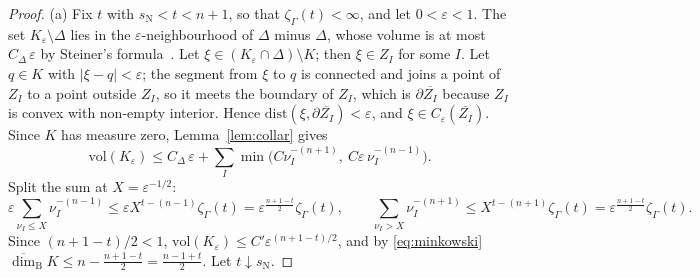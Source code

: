 \documentclass[11pt]{amsart}
\theoremstyle{definition}
\theoremstyle{remark}
\newcommand{\udimB}{\overline{\dim}_{\mathrm B}}
\newcommand{\sN}{s_{\mathrm N}}
\newcommand{\abs}[1]{\lvert #1\rvert}
\begin{document}
\begin{proof}
(a) Fix $t$ with $\sN<t<n+1$, so that $\zeta_\Gamma(t)<\infty$, and let $0<\varepsilon<1$. The set $K_\varepsilon\setminus\Delta$ lies in the $\varepsilon$-neighbourhood of $\Delta$ minus $\Delta$, whose volume is at most $C_\Delta\,\varepsilon$ by Steiner's formula~\cite[(4.8)]{Sch14}. Let $\xi\in(K_\varepsilon\cap\Delta)\setminus K$; then $\xi\in Z_I$ for some $I$. Let $q\in K$ with $\abs{\xi-q}<\varepsilon$; the segment from $\xi$ to $q$ is connected and joins a point of $Z_I$ to a point outside $Z_I$, so it meets the boundary of $Z_I$, which is $\partial\overline{Z_I}$ because $Z_I$ is convex with non-empty interior. Hence $\mathrm{dist}(\xi,\partial\overline{Z_I})<\varepsilon$, and $\xi\in C_\varepsilon(\overline{Z_I})$. Since $K$ has measure zero, Lemma~\ref{lem:collar} gives
\[
  \mathrm{vol}(K_\varepsilon)\le C_\Delta\,\varepsilon+\sum_I\min\bigl(C\nu_I^{-(n+1)},\ C\varepsilon\,\nu_I^{-(n-1)}\bigr).
\]
Split the sum at $X=\varepsilon^{-1/2}$:
\[
  \varepsilon\sum_{\nu_I\le X}\nu_I^{-(n-1)}\le\varepsilon X^{t-(n-1)}\zeta_\Gamma(t)=\varepsilon^{\frac{n+1-t}2}\zeta_\Gamma(t),\qquad
  \sum_{\nu_I>X}\nu_I^{-(n+1)}\le X^{t-(n+1)}\zeta_\Gamma(t)=\varepsilon^{\frac{n+1-t}2}\zeta_\Gamma(t).
\] Since $(n+1-t)/2<1$, $\mathrm{vol}(K_\varepsilon)\le C'\varepsilon^{(n+1-t)/2}$, and by \eqref{eq:minkowski} $\udimB K\le n-\frac{n+1-t}2=\frac{n-1+t}2$. Let $t\downarrow\sN$.


\end{proof}
\end{document}
